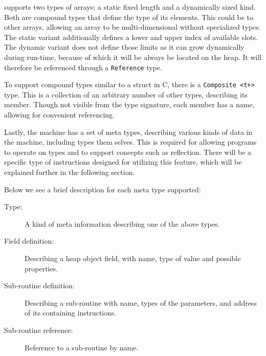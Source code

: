 
\thename{} supports two types of arrays; a static fixed length and a dynamically
sized kind. Both are compound types that define the type of its elements. This
could be to other arrays, allowing an array to be multi-dimensional without
specialized types. The static variant additionally defines a lower and upper
index of available slots. The dynamic variant does not define those limits as it
can grow dynamically during run-time, because of which it will be always be
located on the heap. It will therefore be referenced through a {\tt Reference}
type.


To support compound types similar to a struct in C, there is a {\tt Composite
  <t+>} type. This is a collection of an arbitrary number of other types,
describing its member. Though not visible from the type signature, each member
has a name, allowing for convenient referencing.


Lastly, the machine has a set of meta types, describing various kinds of data in
the machine, including types them selves. This is required for allowing programs
to operate on types and to support concepts such as reflection. There will be a
specific type of instructions designed for utilizing this feature, which will be
explained further in the following section.

Below we see a brief description for each meta type supported:

\begin{description}
\item[Type:] A kind of meta information describing one of the above types.


\item[Field definition:] Describing a heap object field, with name, type of
  value and possible properties.

\item[Sub-routine definition:] Describing a sub-routine with name, types of the
  parameters, and address of its containing instructions.

\item[Sub-routine reference:] Reference to a sub-routine by name.

\end{description}

